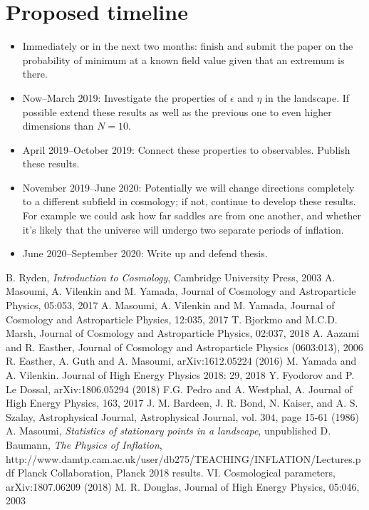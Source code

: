\documentclass[12pt]{article}
\begin{document}
\section{Proposed timeline}
\begin{itemize}
\item Immediately or in the next two months: finish and submit the paper on the probability of minimum at a known field value given that an extremum is there.
\item Now--March 2019: Investigate the properties of $\epsilon$ and $\eta$ in the landscape. If possible extend these results as well as the previous one to even higher dimensions than $N=10$.
\item April 2019--October 2019: Connect these properties to observables. Publish these results.
\item November 2019--June 2020: Potentially we will change directions completely to a different subfield in cosmology; if not, continue to develop these results. For example we could ask how far saddles are from one another, and whether it's likely that the universe will undergo two separate periods of inflation.
\item June 2020--September 2020: Write up and defend thesis.
\end{itemize}

\begin{thebibliography}{99}
 B. Ryden, \emph{Introduction to Cosmology}, Cambridge University Press, 2003
 A. Masoumi, A. Vilenkin and M. Yamada, Journal of Cosmology and Astroparticle Physics, 05:053, 2017
 A. Masoumi, A. Vilenkin and M. Yamada, Journal of Cosmology and Astroparticle Physics, 12:035, 2017
 T. Bjorkmo and M.C.D. Marsh, Journal of Cosmology and Astroparticle Physics, 02:037, 2018
 A. Aazami and R. Easther, Journal of Cosmology and Astroparticle Physics (0603:013), 2006
 R. Easther, A. Guth and A. Masoumi, arXiv:1612.05224 (2016)
 M. Yamada and A. Vilenkin. Journal of High Energy Physics 2018: 29, 2018
 Y. Fyodorov and P. Le Dossal, arXiv:1806.05294 (2018)
 F.G. Pedro and A. Westphal, A. Journal of High Energy Physics, 163, 2017
 J. M. Bardeen, J. R. Bond, N. Kaiser, and A. S. Szalay, Astrophysical Journal, Astrophysical Journal, vol. 304, page 15-61 (1986)
 A. Masoumi, \emph{Statistics of stationary points in a landscape}, unpublished
 D. Baumann, \emph{The Physics of Inflation}, http://www.damtp.cam.ac.uk/user/db275/TEACHING/INFLATION/Lectures.pdf
 Planck Collaboration, Planck 2018 results. VI. Cosmological parameters, arXiv:1807.06209 (2018)
 M. R. Douglas, Journal of High Energy Physics, 05:046, 2003
\end{thebibliography}
\end{document}
